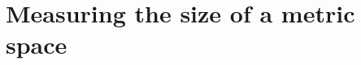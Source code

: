 \documentclass[thesis.tex]{subfiles}
\newcommand{\aspect}[1]{\Delta_{#1}}
\newcommand{\cexp}{c_\textnormal{exp}}
\newcommand{\cdoub}{c_\textnormal{doub}}
\begin{document}


\section{Measuring the size of a metric space}
\label{sec:measure}
\end{document}
